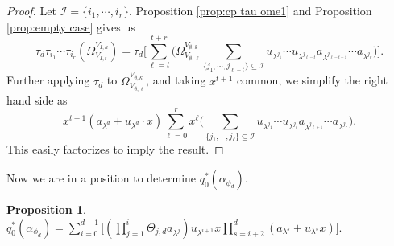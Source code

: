 \documentclass[a4paper,leqno,11pt]{amsart}
\theoremstyle{plain}
\theoremstyle{definition}
\newtheorem{prop}[theorem]{Proposition}
\theoremstyle{remark}
\theoremstyle{definition}
\def\a{\alpha}
\numberwithin{equation}{section}
\begin{document}
	\begin{proof}   Let $ \mathcal{I}=\{i_1,\cdots, i_r\} $. Proposition \ref{prop:cp tau ome1} and Proposition \ref{prop:empty case} gives us
		\begin{equation*}	\tau _d \tau _{i_1}\cdots\tau _{i_r}(\Omega^{V_{I,k}}_{V_{I,t}})= \tau_d\Big[
			\sum_{\ell=t}^{t+r}
			\big(\Omega_{V_{\emptyset,\ell}}^{V_{\emptyset,k}}
			\sum_{{\{j_1,\cdots,j_{\ell-t}\}\subseteq \mathcal{I}}}
			u_{\lambda^{j_1}}\cdots u_{\lambda^{j_{\ell-t}}}
			a_{\lambda^{j_{\ell-t+1}}}
			\cdots a_{\lambda^{j_r}}\big)
			\Big].
		\end{equation*}
		Further applying $ \tau _d $ to $ \Omega_{V_{\emptyset,\ell}}^{V_{\emptyset,k}} $, and  taking  $ x^{t+1} $ common, we simplify the right hand side as
		\[x^{t+1}(a_{\lambda^d}+u_{\lambda^d}\cdot x)
		\sum_{\ell=0}^{r} x^\ell
		\big(
		\sum_{{\{j_1,\cdots,j_{\ell}\}\subseteq \mathcal{I}}}
		u_{\lambda^{j_1}}\cdots u_{\lambda^{j_{\ell}}}
		a_{\lambda^{j_{\ell+1}}}
		\cdots a_{\lambda^{j_r}}\big).
		\]
This easily factorizes to imply the result.
	\end{proof}
	Now we are in a position to determine $ q_0^*(\alpha_{\phi_d}) $.
	\begin{prop}\label{prop:q0 of alp} 
		$  q_0^*(\a_{\phi_d})=\sum_{i=0}^{d-1}\Big[(\prod_{j=1}^{i}\Theta_{j,d} a_{\lambda^j}) u_{\lambda^{i+1}}x\prod_{s=i+2}^{d}(a_{\lambda^s}+u_{\lambda^s} x)\Big].$
	\end{prop}
\end{document}
